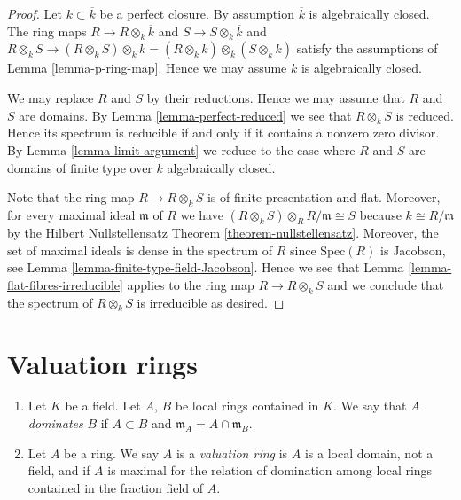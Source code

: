 \begin{proof}
Let $k \subset \overline{k}$ be a perfect closure.
By assumption $\overline{k}$ is algebraically closed.
The ring maps $R \to R\otimes_k \overline{k}$ and
$S \to S \otimes_k \overline{k}$ and
$R \otimes_k S \to (R \otimes_k S) \otimes_k \overline{k}
= (R \otimes_k \overline{k}) \otimes_{\overline{k}} (S \otimes_k \overline{k})$
satisfy the assumptions of Lemma \ref{lemma-p-ring-map}.
Hence we may assume $k$ is algebraically closed.

\medskip\noindent
We may replace $R$ and $S$ by their reductions.
Hence we may assume that $R$ and $S$ are domains.
By Lemma \ref{lemma-perfect-reduced} we see that $R \otimes_k S$ is
reduced. Hence its spectrum is reducible if and only if it contains a nonzero
zero divisor. By Lemma \ref{lemma-limit-argument} we reduce to the case where
$R$ and $S$ are domains of finite type over $k$ algebraically closed.

\medskip\noindent
Note that the ring map $R \to R \otimes_k S$ is of finite
presentation and flat. Moreover, for every maximal ideal
$\mathfrak m$ of $R$ we have
$(R \otimes_k S) \otimes_R R/\mathfrak m \cong S$ because
$k \cong R/\mathfrak m$ by the Hilbert Nullstellensatz Theorem
\ref{theorem-nullstellensatz}. Moreover, the set of
maximal ideals is dense in the spectrum of $R$ since
$\text{Spec}(R)$ is Jacobson, see Lemma \ref{lemma-finite-type-field-Jacobson}.
Hence we see that Lemma \ref{lemma-flat-fibres-irreducible} applies
to the ring map $R \to R \otimes_k S$ and we conclude that
the spectrum of $R \otimes_k S$ is irreducible as desired.
\end{proof}



















\section{Valuation rings}
\label{section-valuation-rings}

\begin{definition}
\label{definition-valuation-ring}
\begin{enumerate}
\item Let $K$ be a field. Let $A$, $B$ be local rings contained
in $K$. We say that $A$ {\it dominates} $B$ if $A \subset B$
and $\mathfrak m_A = A \cap \mathfrak m_B$.
\item Let $A$ be a ring. We say $A$ is a {\it valuation ring}
is $A$ is a local domain, not a field, and if $A$ is maximal
for the relation of domination among local rings contained in
the fraction field of $A$.
\end{enumerate}
\end{definition}

